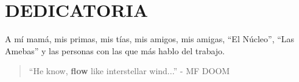 \chapter*{DEDICATORIA}
A mí mamá, mis primas, mis tías, mis amigos, mis amigas, ``El Núcleo'', ``Las Amebas'' y las personas con las que más hablo del trabajo.\\
\vspace{14cm}

\begin{quote}
	``He know, \textbf{flow} like interstellar wind...'' - MF DOOM
\end{quote}
\thispagestyle{empty}

